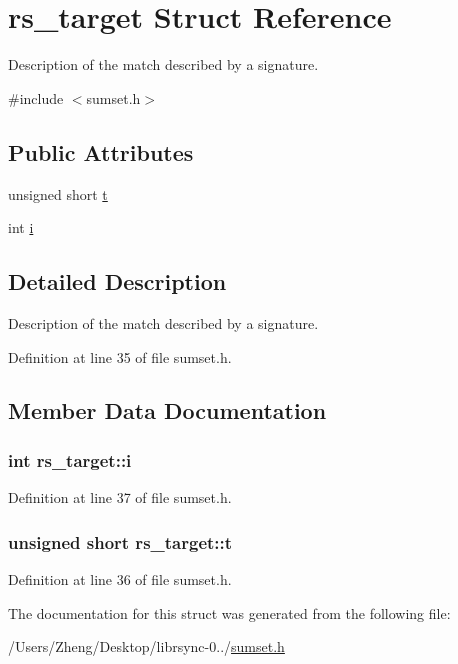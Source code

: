\hypertarget{structrs__target}{}\section{rs\+\_\+target Struct Reference}
\label{structrs__target}


Description of the match described by a signature.  




{\ttfamily \#include $<$sumset.\+h$>$}

\subsection*{Public Attributes}
\begin{DoxyCompactItemize}
\item 
unsigned short \hyperlink{structrs__target_ab784363682dea3aa8c8e0e7ec58c93a4}{t}
\item 
int \hyperlink{structrs__target_a841a5e820b020aac4586f2014b7a3f7d}{i}
\end{DoxyCompactItemize}


\subsection{Detailed Description}
Description of the match described by a signature. 

Definition at line 35 of file sumset.\+h.



\subsection{Member Data Documentation}
\hypertarget{structrs__target_a841a5e820b020aac4586f2014b7a3f7d}{}
\subsubsection[{i}]{\setlength{\rightskip}{0pt plus 5cm}int rs\+\_\+target\+::i}\label{structrs__target_a841a5e820b020aac4586f2014b7a3f7d}


Definition at line 37 of file sumset.\+h.

\hypertarget{structrs__target_ab784363682dea3aa8c8e0e7ec58c93a4}{}
\subsubsection[{t}]{\setlength{\rightskip}{0pt plus 5cm}unsigned short rs\+\_\+target\+::t}\label{structrs__target_ab784363682dea3aa8c8e0e7ec58c93a4}


Definition at line 36 of file sumset.\+h.



The documentation for this struct was generated from the following file\+:\begin{DoxyCompactItemize}
\item 
/\+Users/\+Zheng/\+Desktop/librsync-\/0../\hyperlink{sumset_8h}{sumset.\+h}\end{DoxyCompactItemize}
